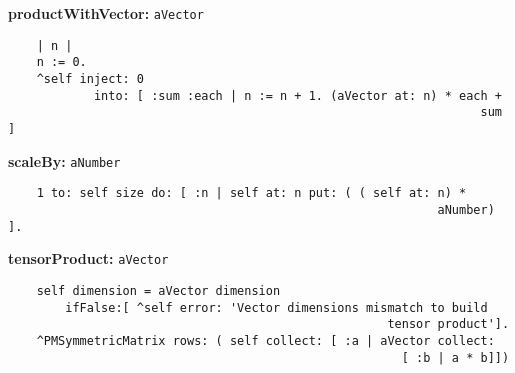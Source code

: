 {\bf productWithVector:} {\tt aVector}
\begin{verbatim}
    | n |
    n := 0.
    ^self inject: 0
            into: [ :sum :each | n := n + 1. (aVector at: n) * each + 
                                                                  sum ]
\end{verbatim}
{\bf scaleBy:} {\tt aNumber}
\begin{verbatim}
    1 to: self size do: [ :n | self at: n put: ( ( self at: n) * 
                                                            aNumber) ].
\end{verbatim}
{\bf tensorProduct:} {\tt aVector}
\begin{verbatim}
    self dimension = aVector dimension
        ifFalse:[ ^self error: 'Vector dimensions mismatch to build 
                                                     tensor product'].
    ^PMSymmetricMatrix rows: ( self collect: [ :a | aVector collect: 
                                                       [ :b | a * b]])
\end{verbatim}

